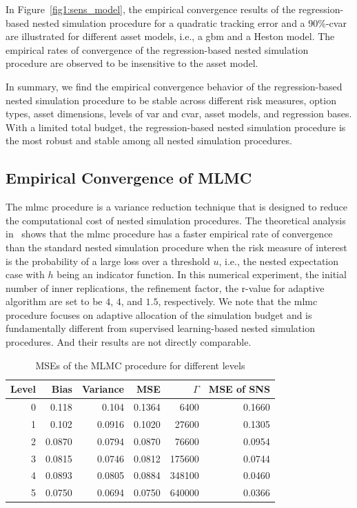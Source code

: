 In Figure~\ref{fig1:sens_model}, the empirical convergence results of the regression-based nested simulation procedure for a quadratic tracking error and a 90\%-\gls{cvar} are illustrated for different asset models, i.e., a \gls{gbm} and a Heston model.
The empirical rates of convergence of the regression-based nested simulation procedure are observed to be insensitive to the asset model.

In summary, we find the empirical convergence behavior of the regression-based nested simulation procedure to be stable across different risk measures, option types, asset dimensions, levels of \gls{var} and \gls{cvar}, asset models, and regression bases.
With a limited total budget, the regression-based nested simulation procedure is the most robust and stable among all nested simulation procedures. 

\subsection{Empirical Convergence of MLMC}\label{sec1:empirical-mlmc}

The \gls{mlmc} procedure is a variance reduction technique that is designed to reduce the computational cost of nested simulation procedures.
The theoretical analysis in~\cite{giles2019multilevel} shows that the \gls{mlmc} procedure has a faster empirical rate of convergence than the standard nested simulation procedure when the risk measure of interest is the probability of a large loss over a threshold $u$, i.e., the nested expectation case with $h$ being an indicator function.
In this numerical experiment, the initial number of inner replications, the refinement factor, the r-value for adaptive algorithm are set to be $4$, $4$, and $1.5$, respectively.
We note that the \gls{mlmc} procedure focuses on adaptive allocation of the simulation budget and is fundamentally different from supervised learning-based nested simulation procedures. And their results are not directly comparable.

\begin{table}[ht]
    \centering
    \begin{tabular}{rrrrrr}
    \toprule
    \textbf{Level} & \textbf{Bias} & \textbf{Variance} & \textbf{MSE} & $\Gamma$ & \textbf{MSE of SNS} \\ 
    \hline\hline
    0 & 0.118  & 0.104  & 0.1364 & 6400     & 0.1660    \\
    1 & 0.102  & 0.0916 & 0.1020 & 27600    & 0.1305    \\
    2 & 0.0870 & 0.0794 & 0.0870 & 76600    & 0.0954    \\
    3 & 0.0815 & 0.0746 & 0.0812 & 175600   & 0.0744    \\
    4 & 0.0893 & 0.0805 & 0.0884 & 348100   & 0.0460    \\
    5 & 0.0750 & 0.0694 & 0.0750 & 640000   & 0.0366    \\
    \bottomrule
    \end{tabular}
    \caption{MSEs of the MLMC procedure for different levels}
\label{tab1:mlmc-mse}
\end{table}

